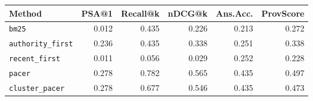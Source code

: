 \begin{tabular}{lrrrrr}
\hline
Method & PSA@1 & Recall@k & nDCG@k & Ans.Acc. & ProvScore \\
\hline
\texttt{bm25} & 0.012 & 0.435 & 0.226 & 0.213 & 0.272 \\
\texttt{authority\_first} & 0.236 & 0.435 & 0.338 & 0.251 & 0.338 \\
\texttt{recent\_first} & 0.011 & 0.056 & 0.029 & 0.252 & 0.228 \\
\texttt{pacer} & 0.278 & 0.782 & 0.565 & 0.435 & 0.497 \\
\texttt{cluster\_pacer} & 0.278 & 0.677 & 0.546 & 0.435 & 0.473 \\
\hline
\end{tabular}


